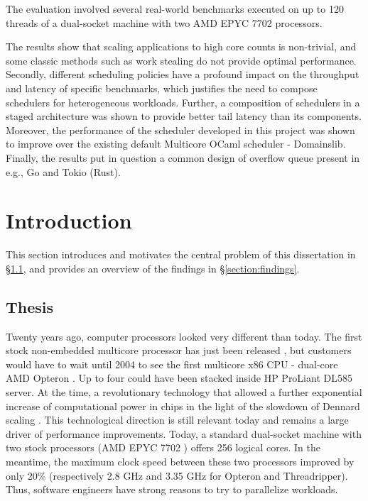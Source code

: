 \documentclass[12pt,a4paper,twoside]{report}
\begin{document}
The evaluation involved several real-world benchmarks executed on up to 120 threads of a dual-socket machine with two AMD EPYC 7702 processors.

The results show that scaling applications to high core counts is non-trivial, and some classic methods such as work stealing do not provide optimal performance. Secondly, different scheduling policies have a profound impact on the throughput and latency of specific benchmarks, which justifies the need to compose schedulers for heterogeneous workloads. Further, a composition of schedulers in a staged architecture was shown to provide better tail latency than its components. Moreover, the performance of the scheduler developed in this project was shown to improve over the existing default Multicore OCaml scheduler - Domainslib. Finally, the results put in question a common design of overflow queue present in e.g., Go and Tokio (Rust).

\tableofcontents

\chapter{Introduction}

\label{firstcontentpage} %

\label{section:introduction}
This section introduces and motivates the central problem of this dissertation in \S\ref{section:thesis}, and provides an overview of the findings in \S\ref{section:findings}.  

\section{Thesis}
\label{section:thesis}
Twenty years ago, computer processors looked very different than today. The first stock non-embedded multicore processor has just been released \cite{Stallings}, but customers would have to wait until 2004 to see the first multicore x86 CPU - dual-core AMD Opteron \cite{AMDAnnou13:online}. Up to four could have been stacked inside HP ProLiant DL585 server. At the time, a revolutionary technology that allowed a further exponential increase of computational power in chips \cite{mooremulti} in the light of the slowdown of Dennard scaling \cite{Bohr2007}. This technological direction is still relevant today and remains a large driver of performance improvements. Today, a standard dual-socket machine with two stock processors (AMD EPYC 7702 \cite{2ndGenAM1:online}) offers 256 logical cores. In the meantime, the maximum clock speed between these two processors improved by only 20\% (respectively 2.8 GHz and 3.35 GHz for Opteron and Threadripper). Thus, software engineers have strong reasons to try to parallelize workloads. 
\end{document}
